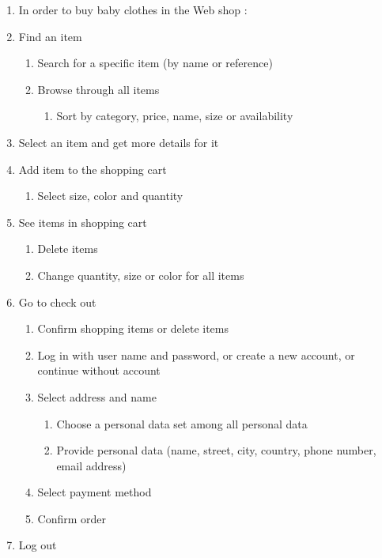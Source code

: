 \begin{enumerate}[label*=\arabic*.,start=0,itemsep=-4pt]
  \item In order to buy baby clothes in the Web shop :
  \item Find an item 
    \begin{enumerate}[label*=\arabic*.,itemsep=-4pt]
      \item Search for a specific item (by name or reference)
      \item Browse through all items
				\begin{enumerate}[label*=\arabic*.,itemsep=-4pt]
				  \item Sort by category, price, name, size or availability
        \end{enumerate}
    \end{enumerate}
  \item Select an item and get more details for it
  \item Add item to the shopping cart
    \begin{enumerate}[label*=\arabic*.,itemsep=-4pt]
      \item Select size, color and quantity
    \end{enumerate}
  \item See items in shopping cart
    \begin{enumerate}[label*=\arabic*.,itemsep=-4pt]
      \item Delete items
      \item Change quantity, size or color for all items
    \end{enumerate}
  \item Go to check out
    \begin{enumerate}[label*=\arabic*.,itemsep=-4pt]
      \item Confirm shopping items or delete items
      \item Log in with user name and password, or create a new account, or continue without account
      \item Select address and name
	\begin{enumerate}[label*=\arabic*.,itemsep=-4pt]
	  \item Choose a personal data set among all personal data 
	  \item Provide personal data (name, street, city, country, phone number, email address)
        \end{enumerate}
      \item Select payment method
      \item Confirm order      
    \end{enumerate}
  \item Log out
\end{enumerate}
